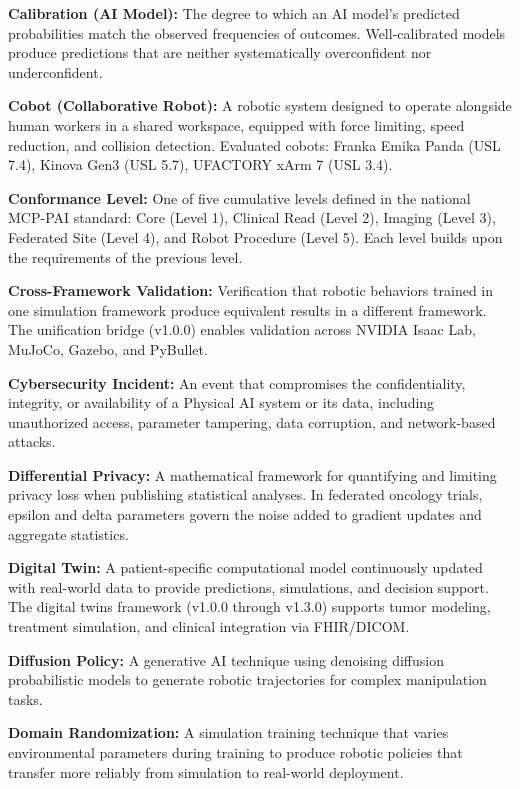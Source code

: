 \documentclass[11pt]{article}
\begin{document}
\textbf{Calibration (AI Model):} The degree to which an AI model's predicted probabilities match the observed frequencies of outcomes. Well-calibrated models produce predictions that are neither systematically overconfident nor underconfident.

\textbf{Cobot (Collaborative Robot):} A robotic system designed to operate alongside human workers in a shared workspace, equipped with force limiting, speed reduction, and collision detection. Evaluated cobots: Franka Emika Panda (USL 7.4), Kinova Gen3 (USL 5.7), UFACTORY xArm 7 (USL 3.4).

\textbf{Conformance Level:} One of five cumulative levels defined in the national MCP-PAI standard: Core (Level 1), Clinical Read (Level 2), Imaging (Level 3), Federated Site (Level 4), and Robot Procedure (Level 5). Each level builds upon the requirements of the previous level.

\textbf{Cross-Framework Validation:} Verification that robotic behaviors trained in one simulation framework produce equivalent results in a different framework. The unification bridge (v1.0.0) enables validation across NVIDIA Isaac Lab, MuJoCo, Gazebo, and PyBullet.

\textbf{Cybersecurity Incident:} An event that compromises the confidentiality, integrity, or availability of a Physical AI system or its data, including unauthorized access, parameter tampering, data corruption, and network-based attacks.

\textbf{Differential Privacy:} A mathematical framework for quantifying and limiting privacy loss when publishing statistical analyses. In federated oncology trials, epsilon and delta parameters govern the noise added to gradient updates and aggregate statistics.

\textbf{Digital Twin:} A patient-specific computational model continuously updated with real-world data to provide predictions, simulations, and decision support. The digital twins framework (v1.0.0 through v1.3.0) supports tumor modeling, treatment simulation, and clinical integration via FHIR/DICOM.

\textbf{Diffusion Policy:} A generative AI technique using denoising diffusion probabilistic models to generate robotic trajectories for complex manipulation tasks.

\textbf{Domain Randomization:} A simulation training technique that varies environmental parameters during training to produce robotic policies that transfer more reliably from simulation to real-world deployment.
\end{document}
